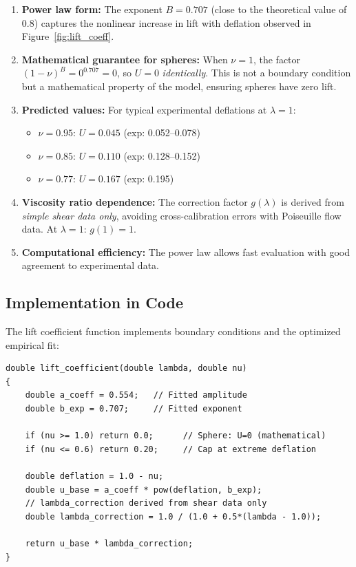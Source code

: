 \documentclass{article}
\begin{document}
\begin{enumerate}
    \item \textbf{Power law form:} The exponent $B = 0.707$ (close to the theoretical value of 0.8) captures the nonlinear increase in lift with deflation observed in Figure~\ref{fig:lift_coeff}.
    
    \item \textbf{Mathematical guarantee for spheres:} When $\nu = 1$, the factor $(1-\nu)^B = 0^{0.707} = 0$, so $U = 0$ \emph{identically}. This is not a boundary condition but a mathematical property of the model, ensuring spheres have zero lift.
    
    \item \textbf{Predicted values:} For typical experimental deflations at $\lambda = 1$:
    \begin{itemize}
        \item $\nu = 0.95$: $U = 0.045$ (exp: 0.052--0.078)
        \item $\nu = 0.85$: $U = 0.110$ (exp: 0.128--0.152)
        \item $\nu = 0.77$: $U = 0.167$ (exp: 0.195)
    \end{itemize}
    
    \item \textbf{Viscosity ratio dependence:} The correction factor $g(\lambda)$ is derived from \emph{simple shear data only}, avoiding cross-calibration errors with Poiseuille flow data. At $\lambda = 1$: $g(1) = 1$.
    
    \item \textbf{Computational efficiency:} The power law allows fast evaluation with good agreement to experimental data.
\end{enumerate}

\subsection{Implementation in Code}

The lift coefficient function implements boundary conditions and the optimized empirical fit:

\begin{verbatim}
double lift_coefficient(double lambda, double nu)
{
    double a_coeff = 0.554;   // Fitted amplitude
    double b_exp = 0.707;     // Fitted exponent
    
    if (nu >= 1.0) return 0.0;      // Sphere: U=0 (mathematical)
    if (nu <= 0.6) return 0.20;     // Cap at extreme deflation
    
    double deflation = 1.0 - nu;
    double u_base = a_coeff * pow(deflation, b_exp);
    // lambda_correction derived from shear data only
    double lambda_correction = 1.0 / (1.0 + 0.5*(lambda - 1.0));
    
    return u_base * lambda_correction;
}
\end{verbatim}
\end{document}
